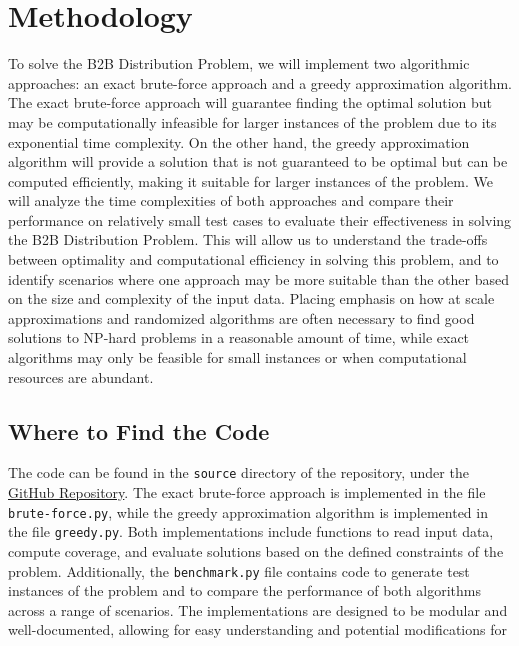 \documentclass[letterpaper]{article}
\begin{document}
\section{Methodology}
To solve the B2B Distribution Problem, we will implement two algorithmic approaches: an exact brute-force approach and a greedy approximation algorithm. The exact brute-force approach will guarantee finding the optimal solution but may be computationally infeasible for larger instances of the problem due to its exponential time complexity. On the other hand, the greedy approximation algorithm will provide a solution that is not guaranteed to be optimal but can be computed efficiently, making it suitable for larger instances of the problem. We will analyze the time complexities of both approaches and compare their performance on relatively small test cases to evaluate their effectiveness in solving the B2B Distribution Problem.
\newline 
\newline 
This will allow us to understand the trade-offs between optimality and computational efficiency in solving this problem, and to identify scenarios where one approach may be more suitable than the other based on the size and complexity of the input data. Placing emphasis on how at scale approximations and randomized algorithms are often necessary to find good solutions to NP-hard problems in a reasonable amount of time, while exact algorithms may only be feasible for small instances or when computational resources are abundant.

\subsection{Where to Find the Code}
The code can be found in the \texttt{source} directory of the repository, under the \href{https://github.com/Dampmar/b2b-np-problem}{GitHub Repository}. The exact brute-force approach is implemented in the file \texttt{brute-force.py}, while the greedy approximation algorithm is implemented in the file \texttt{greedy.py}. Both implementations include functions to read input data, compute coverage, and evaluate solutions based on the defined constraints of the problem. Additionally, the \texttt{benchmark.py} file contains code to generate test instances of the problem and to compare the performance of both algorithms across a range of scenarios. The implementations are designed to be modular and well-documented, allowing for easy understanding and potential modifications for
\end{document}
